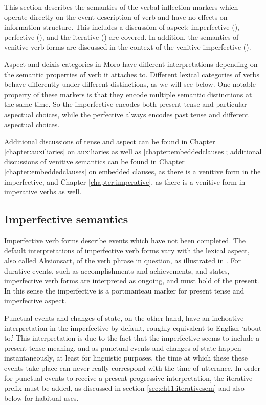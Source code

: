 This section describes the semantics of the verbal inflection markers which operate directly on the event description of verb and have no effects on information structure. This includes a discussion of aspect: imperfective (), perfective (), and the iterative () are covered. In addition, the semantics of venitive verb forms are discussed in the context of the venitive imperfective ().

Aspect and deixis categories in Moro have different interpretations depending on the semantic properties of verb it attaches to. Different lexical categories of verbs behave differently under different distinctions, as we will see below. One notable property of these markers is that they encode multiple semantic distinctions at the same time. So the imperfective encodes both present tense and particular aspectual choices, while the perfective always encodes past tense and different aspectual choices.

Additional discussions of tense and aspect can be found in Chapter \ref{chapter:auxiliaries} on auxiliaries as well as \ref{chapter:embeddedclauses}; additional discussions of venitive semantics can be found in Chapter \ref{chapter:embeddedclauses} on embedded clauses, as there is a venitive form in the imperfective, and Chapter \ref{chapter:imperative}, as there is a venitive form in imperative verbs as well.

\subsection{Imperfective semantics}\label{sec:ch11:imperfectivesem}

Imperfective verb forms describe events which have not been completed. The default interpretations of imperfective verb forms vary with the lexical aspect, also called Aksionsart, of the verb phrase in question, as illustrated in . For durative events, such as accomplishments and achievements, and states, imperfective verb forms are interpreted as ongoing, and must hold of the present. In this sense the imperfective is a portmanteau marker for present tense and imperfective aspect.

Punctual events and changes of state, on the other hand, have an inchoative interpretation in the imperfective by default, roughly equivalent to English `about to.' This interpretation is due to the fact that the imperfective seems to include a present tense meaning, and as punctual events and changes of state happen instantaneously, at least for linguistic purposes, the time at which these these events take place can never really correspond with the time of utterance. In order for punctual events to receive a present progressive interpretation, the iterative prefix must be added, as discussed in section \ref{sec:ch11:iterativesem} and also below for habitual uses.

